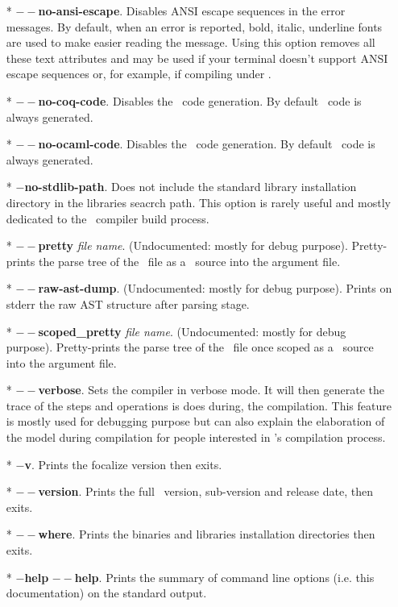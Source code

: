 \begin{itemize}
  \item[*] {\bf $--$no-ansi-escape}. Disables ANSI escape sequences in
    the error messages. By default, when an error is reported, bold,
    italic, underline fonts are used to make easier reading the
    message. Using this option removes all these text attributes and
    may be used if your terminal doesn't support ANSI escape sequences
    or, for example, if compiling under \emacs.

  \item[*] {\bf $--$no-coq-code}. Disables the \coq\ code
    generation. By default \coq\ code is always generated.

  \item[*] {\bf $--$no-ocaml-code}. Disables the \ocaml\ code
    generation. By default \ocaml\ code is always generated.

  \item[*] {\bf $-$no-stdlib-path}. Does not include the standard
    library installation directory in the libraries seacrch path. This
    option is rarely useful and mostly dedicated to the
    \focal\ compiler build process.

  \item[*] {\bf $--$pretty} {\em file name}. (Undocumented: mostly for
    debug purpose). Pretty-prints the parse tree of the \focal\ file
    as a \focal\ source into the argument file.

  \item[*] {\bf $--$raw-ast-dump}. (Undocumented: mostly for debug
    purpose). Prints on stderr the raw AST structure after parsing
    stage.

 \item[*] {\bf $--$scoped\_pretty} {\em file name}. (Undocumented:
   mostly for debug purpose). Pretty-prints the parse tree of the
   \focal\ file once scoped as a \focal\ source into the argument
   file.

  \item[*] {\bf $--$verbose}. Sets the compiler in verbose mode. It
    will then generate the trace of the steps and operations is does
    during, the compilation. This feature is mostly used for debugging
    purpose but can also explain the elaboration of the model during
    compilation for people interested in \focal's compilation
    process.

  \item[*] {\bf $-$v}. Prints the focalize version then exits.

  \item[*] {\bf $--$version}. Prints the full \focal\ version,
    sub-version and release date, then exits.

  \item[*] {\bf $--$where}. Prints the binaries and libraries
    installation directories then exits.

  \item[*] {\bf $-$help} {\bf $--$help}. Prints the summary of command
    line options (i.e. this documentation) on the standard output.
\end{itemize}
